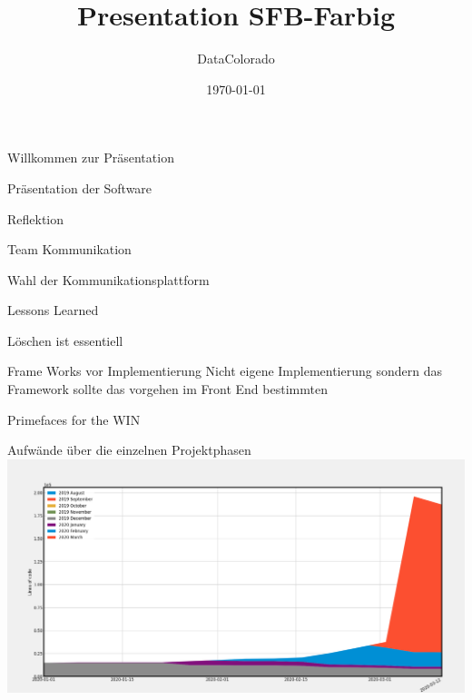 \documentclass[presentation]{beamer}
\author{DataColorado}
\date{\today}
\title{Presentation SFB-Farbig}
\begin{document}
\maketitle

\begin{frame}[label={sec:org7880101}]{Willkommen zur Präsentation}
\end{frame}
\begin{frame}[label={sec:org42d1de8}]{Präsentation der Software}
\end{frame}
\begin{frame}[label={sec:org781fa61}]{Reflektion}
\end{frame}
\begin{frame}[label={sec:orga42ae55}]{Team Kommunikation}
\begin{block}{Wahl der Kommunikationsplattform}
\end{block}
\end{frame}

\begin{frame}[label={sec:orgca97e8d}]{Lessons Learned}
\begin{block}{Löschen ist essentiell}
\end{block}
\begin{block}{Frame Works vor Implementierung}
Nicht eigene Implementierung sondern das Framework sollte das vorgehen im Front End bestimmten
\end{block}
\begin{block}{Primefaces for the WIN}
\end{block}
\end{frame}


\begin{frame}[label={sec:org3934d65}]{Aufwände über die einzelnen Projektphasen}
\includegraphics[width=1\textwidth]{project.png} 
\end{frame}
\end{document}
